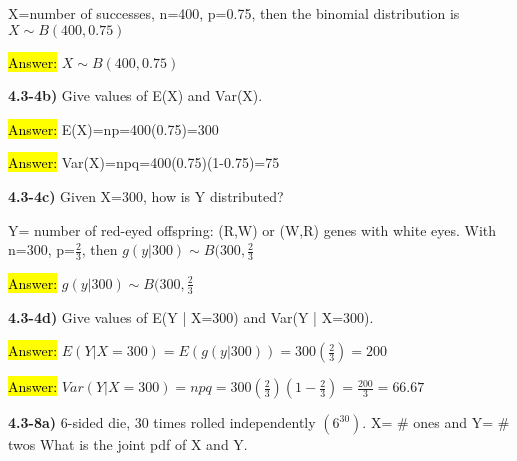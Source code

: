 \documentclass{article}
\begin{document}
X=number of successes, n=400, p=0.75, then the binomial distribution is $X \sim B(400, 0.75)$

\vspace{2mm}



\hl{Answer:} $X \sim B(400, 0.75)$

\vspace{4mm}


\textbf{4.3-4b)} Give values of E(X) and Var(X).

\vspace{2mm}

\hl{Answer:}
 E(X)=np=400(0.75)=300

\vspace{2mm}

\hl{Answer:}
 Var(X)=npq=400(0.75)(1-0.75)=75



\vspace{5mm}


\textbf{4.3-4c)} Given X=300, how is Y distributed?

\vspace{2mm}

Y= number of red-eyed offspring: (R,W) or (W,R) genes with white eyes. With n=300, p=$\frac{2}{3}$, then $g(y | 300) \sim B(300, \frac{2}{3}$



\hl{Answer:} $g(y | 300) \sim B(300, \frac{2}{3}$



\vspace{4mm}

\textbf{4.3-4d)} Give values of E(Y | X=300) and Var(Y | X=300).

\vspace{2mm}

\hl{Answer:} $E(Y | X=300)=E(g(y | 300))=300(\frac{2}{3})=200$

\vspace{4mm}


\hl{Answer:} $Var(Y | X=300)=npq=300(\frac{2}{3})(1-\frac{2}{3})=\frac{200}{3}=66.67$






\newpage
\textbf{4.3-8a)} 6-sided  die, 30 times rolled independently $(6^{30})$. X= \# ones and Y= \# twos What is the joint pdf of X and Y.

\vspace{2mm}
\end{document}
